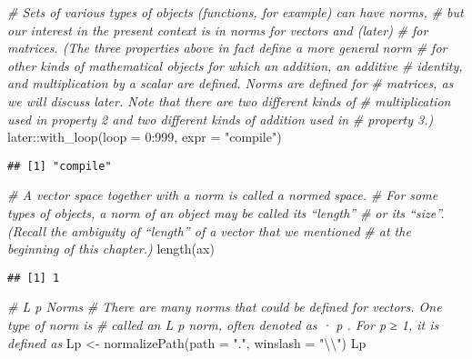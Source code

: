 \documentclass[
]{article}
\newenvironment{Shaded}{\begin{snugshade}}{\end{snugshade}}
\newcommand{\AttributeTok}[1]{\textcolor[rgb]{0.77,0.63,0.00}{#1}}
\newcommand{\CommentTok}[1]{\textcolor[rgb]{0.56,0.35,0.01}{\textit{#1}}}
\newcommand{\DecValTok}[1]{\textcolor[rgb]{0.00,0.00,0.81}{#1}}
\newcommand{\FunctionTok}[1]{\textcolor[rgb]{0.00,0.00,0.00}{#1}}
\newcommand{\NormalTok}[1]{#1}
\newcommand{\OtherTok}[1]{\textcolor[rgb]{0.56,0.35,0.01}{#1}}
\newcommand{\SpecialCharTok}[1]{\textcolor[rgb]{0.00,0.00,0.00}{#1}}
\newcommand{\StringTok}[1]{\textcolor[rgb]{0.31,0.60,0.02}{#1}}
\begin{document}
\begin{Shaded}
\begin{Highlighting}[]
\CommentTok{\# Sets of various types of objects (functions, for example) can have norms,}
\CommentTok{\# but our interest in the present context is in norms for vectors and (later)}
\CommentTok{\# for matrices. (The three properties above in fact deﬁne a more general norm}
\CommentTok{\# for other kinds of mathematical objects for which an addition, an additive}
\CommentTok{\# identity, and multiplication by a scalar are deﬁned. Norms are deﬁned for}
\CommentTok{\# matrices, as we will discuss later. Note that there are two diﬀerent kinds of}
\CommentTok{\# multiplication used in property 2 and two diﬀerent kinds of addition used in}
\CommentTok{\# property 3.)}
\NormalTok{later}\SpecialCharTok{::}\FunctionTok{with\_loop}\NormalTok{(}\AttributeTok{loop =} \DecValTok{0}\SpecialCharTok{:}\DecValTok{999}\NormalTok{, }\AttributeTok{expr =} \StringTok{"compile"}\NormalTok{)}
\end{Highlighting}
\end{Shaded}

\begin{verbatim}
## [1] "compile"
\end{verbatim}

\begin{Shaded}
\begin{Highlighting}[]
\CommentTok{\# A vector space together with a norm is called a normed space.}
\CommentTok{\# For some types of objects, a norm of an object may be called its “length”}
\CommentTok{\# or its “size”. (Recall the ambiguity of “length” of a vector that we mentioned}
\CommentTok{\# at the beginning of this chapter.)}
\FunctionTok{length}\NormalTok{(ax)}
\end{Highlighting}
\end{Shaded}

\begin{verbatim}
## [1] 1
\end{verbatim}

\begin{Shaded}
\begin{Highlighting}[]
\CommentTok{\# L p Norms}
\CommentTok{\# There are many norms that could be deﬁned for vectors. One type of norm is}
\CommentTok{\# called an L p norm, often denoted as  · p . For p ≥ 1, it is deﬁned as}
\NormalTok{Lp }\OtherTok{\textless{}{-}} \FunctionTok{normalizePath}\NormalTok{(}\AttributeTok{path =} \StringTok{"."}\NormalTok{, }\AttributeTok{winslash =} \StringTok{"}\SpecialCharTok{\textbackslash{}\textbackslash{}}\StringTok{"}\NormalTok{)}
\NormalTok{Lp}
\end{Highlighting}
\end{Shaded}
\end{document}
